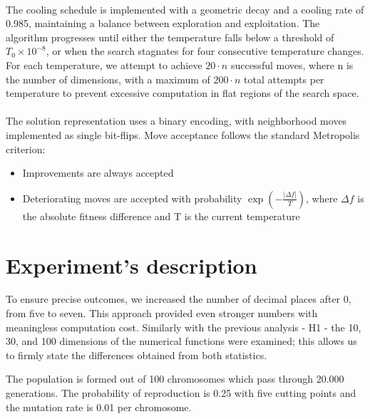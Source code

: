 \documentclass{article}
\begin{document}
\paragraph{}
The cooling schedule is implemented with a geometric decay and a cooling rate of 0.985, maintaining a balance between exploration and exploitation. The algorithm progresses until either the temperature falls below a threshold of $T_0\times10^{-8}$, or when the search stagnates for four consecutive temperature changes. For each temperature, we attempt to achieve $20\cdot n$ successful moves, where n is the number of dimensions, with a maximum of $200\cdot n$ total attempts per temperature to prevent excessive computation in flat regions of the search space. 

\paragraph{}
The solution representation uses a binary encoding, with neighborhood moves implemented as single bit-flips. Move acceptance follows the standard Metropolis \cite{m} criterion:
\begin{itemize}
    \item Improvements are always accepted
    \item Deteriorating moves are accepted with probability $\exp\left(-\frac{| \Delta f |}{T}\right)$, where $\Delta f$ is the absolute fitness difference and T is the current temperature
\end{itemize}

\section{Experiment's description}

To ensure precise outcomes, we increased the number of decimal places after 0, from five to seven. This approach provided even stronger numbers with meaningless computation cost. Similarly with the previous analysis - H1 - the 10, 30, and 100 dimensions of the numerical functions were examined; this allows us to firmly state the differences obtained from both statistics.

The population is formed out of 100 chromosomes which 
pass through 20.000 generations. The probability of reproduction is 0.25 with five cutting points and the mutation rate is 0.01 per chromosome.


\newpage
\end{document}
